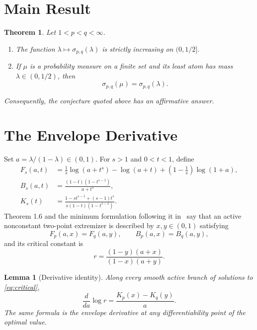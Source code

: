 \documentclass[11pt]{article}
\newtheorem{theorem}{Theorem}
\newtheorem{lemma}{Lemma}
\begin{document}
\section*{Main Result}

\begin{theorem}\label{thm:main}
Let $1<p<q<\infty$.
\begin{enumerate}
\item The function $\lambda\mapsto\sigma_{p,q}(\lambda)$ is strictly
increasing on $(0,1/2]$.
\item If $\mu$ is a probability measure on a finite set and its least atom
has mass $\lambda\in(0,1/2)$, then
\[
                         \sigma_{p,q}(\mu)=\sigma_{p,q}(\lambda).
\]
\end{enumerate}
Consequently, the conjecture quoted above has an affirmative answer.
\end{theorem}

\section*{The Envelope Derivative}

Set $a=\lambda/(1-\lambda)\in(0,1)$.  For $s>1$ and $0<t<1$, define
\begin{align*}
 F_s(a,t)
 &=\frac1s\log(a+t^s)-\log(a+t)
   +\left(1-\frac1s\right)\log(1+a),\\
 B_s(a,t)
 &=\frac{(1-t)(1-t^{s-1})}{a+t^s},\\
 K_s(t)
 &=\frac{1-st^{s-1}+(s-1)t^s}
 {s(1-t)(1-t^{s-1})}.
\end{align*}
Theorem 1.6 and the minimum formulation following it in~\cite{CaoEtAl}
say that an active nonconstant two-point extremizer is described by
$x,y\in(0,1)$ satisfying
\begin{equation}\label{eq:critical}
 F_p(a,x)=F_q(a,y),
 \qquad B_p(a,x)=B_q(a,y),
\end{equation}
and its critical constant is
\begin{equation}\label{eq:rformula}
 r=\frac{(1-y)(a+x)}{(1-x)(a+y)}.
\end{equation}

\begin{lemma}[Derivative identity]\label{lem:derivative}
Along every smooth active branch of solutions to \eqref{eq:critical},
\[
                  \frac{d}{da}\log r
                  =\frac{K_p(x)-K_q(y)}{a}.
\]
The same formula is the envelope derivative at any differentiability point
of the optimal value.
\end{lemma}
\end{document}
